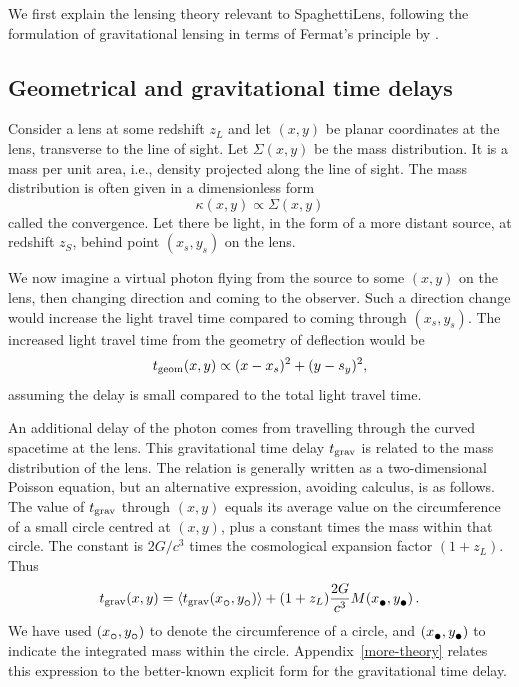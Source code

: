 \documentclass[usenatbib]{mn2e}
\newcommand{\spl}{SpaghettiLens\xspace}
\newcommand{\tgeom}{t_{\rm geom}}
\newcommand{\tgrav}{t_{\rm grav}}
\newcommand{\subcirc}{{\lower.33ex\hbox{$\circ$}}}
\newcommand{\subbullet}{{\lower.33ex\hbox{$\bullet$}}}
\begin{document}
We first explain the lensing theory relevant to \spl, following the
formulation of gravitational lensing in terms of Fermat's principle by
\cite{1986ApJ...310..568B}.


\subsection{Geometrical and gravitational time delays}

Consider a lens at some redshift $z_L$ and let $(x,y)$ be planar
coordinates at the lens, transverse to the line of sight.  Let
$\Sigma(x,y)$ be the mass distribution.  It is a mass per unit area,
i.e., density projected along the line of sight.  The mass
distribution is often given in a dimensionless form
\begin{equation} \label{eq:kappa}
\kappa(x,y) \propto \Sigma(x,y)
\end{equation}
called the convergence.  Let there be light, in the form of a more
distant source, at redshift $z_S$, behind point $(x_s,y_s)$ on the
lens.

We now imagine a virtual photon flying from the source to some $(x,y)$
on the lens, then changing direction and coming to the observer.  Such
a direction change would increase the light travel time compared to
coming through $(x_s,y_s)$.  The increased light travel time from the
geometry of deflection would be
\begin{equation} \label{eq:tgeom}
\tgeom(x,y) \propto (x-x_s)^2 + (y-s_y)^2 ,
\end{equation}
assuming the delay is small compared to the total light travel time.

An additional delay of the photon comes from travelling through the
curved spacetime at the lens.  This gravitational time delay $\tgrav$
is related to the mass distribution of the lens.  The relation is
generally written as a two-dimensional Poisson equation, but an
alternative expression, avoiding calculus, is as follows.  The value
of $\tgrav$ through $(x,y)$ equals its average value on the
circumference of a small circle centred at $(x,y)$, plus a constant
times the mass within that circle.  The constant is $2G/c^3$ times the
cosmological expansion factor $(1+z_L)$. Thus
\begin{equation} \label{eq:tgrav}
\tgrav(x,y) = \left\langle \tgrav(x_\subcirc,y_\subcirc) \right\rangle
              + (1+z_L) \frac{2G}{c^3} M(x_\subbullet,y_\subbullet) \,.
\end{equation}
We have used $(x_\subcirc,y_\subcirc)$ to denote the circumference of
a circle, and $(x_\subbullet,y_\subbullet)$ to indicate the integrated
mass within the circle.  Appendix~\ref{more-theory} relates this
expression to the better-known explicit form for the gravitational
time delay.
\end{document}

